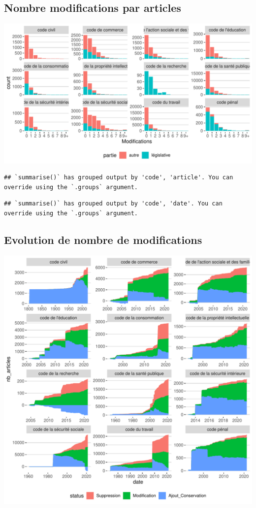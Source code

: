 \documentclass[
  oneside]{book}
\begin{document}
\hypertarget{nombre-modifications-par-articles}{%
\subsection{Nombre modifications par articles}\label{nombre-modifications-par-articles}}

\includegraphics{05-images_files/figure-latex/modif.glob.plot2-1.pdf}

\begin{verbatim}
## `summarise()` has grouped output by 'code', 'article'. You can override using the `.groups` argument.
\end{verbatim}

\begin{verbatim}
## `summarise()` has grouped output by 'code', 'date'. You can override using the `.groups` argument.
\end{verbatim}

\hypertarget{evolution-de-nombre-de-modifications}{%
\subsection{Evolution de nombre de modifications}\label{evolution-de-nombre-de-modifications}}

\includegraphics{05-images_files/figure-latex/modif.evol.plot-1.pdf}
\end{document}
